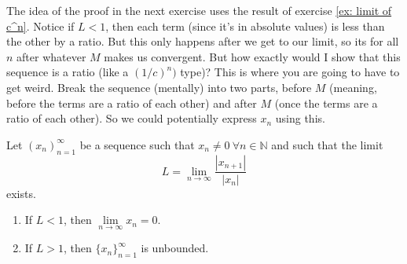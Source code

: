 \documentclass[../main.tex]{subfiles}
\begin{document}
    
    
    
    
    
    
    
    
    
    
    
    
    \begin{remark}
    The idea of the proof in the next exercise uses the result of exercise \ref{ex: limit of c^n}. Notice if \( L < 1\), then each term (since it's in absolute values) is less than the other by a ratio. But this only happens after we get to our limit, so its for all \(n\) after whatever \(M\) makes us convergent. But how exactly would I show that this sequence is a ratio (like a \((1/c)^n)\) type)? This is where you are going to have to get weird. Break the sequence (mentally) into two parts, before \(M\) (meaning, before the terms are a ratio of each other) and after \(M\) (once the terms are a ratio of each other). So we could potentially express \( x_n\) using this.
    \end{remark}
    
    
    
    
    
    
    
    \begin{exercise} \label{ex:ratio_test}
    Let \( (x_n)_{n=1}^{\infty} \) be a sequence such that \( x_n \neq 0 \ \forall n \in \mathbb{N}\) and such that the limit
    \[
    L = \lim_{n \to \infty} \frac{|x_{n+1}|}{|x_n|}
    \]
    exists.
    \begin{enumerate}
        \item If \( L < 1 \), then \( \lim\limits_{n\to\infty} x_n = 0 \).
        \item If \( L > 1 \), then \( \{x_n\}_{n=1}^{\infty} \) is unbounded.
    \end{enumerate}
    \end{exercise}
    
    
    
    
    
    
    
\end{document}
